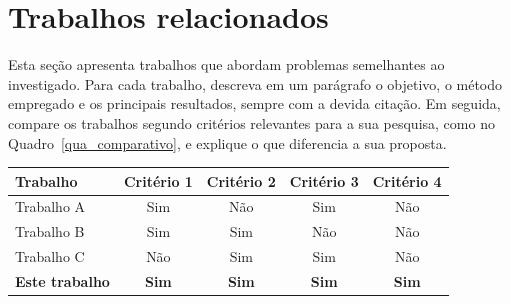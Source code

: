 \section{Trabalhos relacionados}
\label{sec_trabalhos_relacionados}


Esta seção apresenta trabalhos que abordam problemas semelhantes ao investigado. Para cada trabalho, descreva em um parágrafo o objetivo, o método empregado e os principais resultados, sempre com a devida citação. Em seguida, compare os trabalhos segundo critérios relevantes para a sua pesquisa, como no Quadro~\ref{qua_comparativo}, e explique o que diferencia a sua proposta.

\begin{quadro}[htb]
	\centering
	\caption{Comparação entre os trabalhos relacionados e este trabalho (exemplo).}
	\label{qua_comparativo}
	\small
	\begin{tabular}{|l|c|c|c|c|}
		\hline
		\textbf{Trabalho} & \textbf{Critério 1} & \textbf{Critério 2} & \textbf{Critério 3} & \textbf{Critério 4} \\ \hline
		Trabalho A & Sim & Não & Sim & Não \\ \hline
		Trabalho B & Sim & Sim & Não & Não \\ \hline
		Trabalho C & Não & Sim & Sim & Não \\ \hline
		\textbf{Este trabalho} & \textbf{Sim} & \textbf{Sim} & \textbf{Sim} & \textbf{Sim} \\ \hline
	\end{tabular}
\end{quadro}
